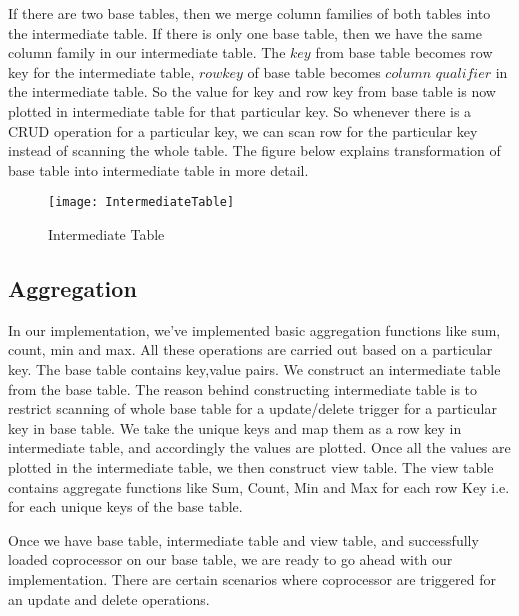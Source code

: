 \documentclass[11pt,a4paper,bibtotoc,idxtotoc,headsepline,footsepline,footexclude,BCOR12mm,DIV13]{scrbook}
\begin{document}
If there are two base tables, then we merge column families of both tables into the intermediate table. If there is only one base table, then we have the same column family in our intermediate table. The $key$ from base table becomes row key for the intermediate table, $row key$ of base table becomes $column$ $qualifier$ in the intermediate table. So the value for key and row key from base table is now plotted in intermediate table for that particular key. So whenever there is a CRUD operation for a particular key, we can scan row for the particular key instead of scanning the whole table. The figure below explains transformation of base table into intermediate table in more detail. 

\begin{figure}
	\centering
	\texttt{[image: IntermediateTable]}
	\caption{Intermediate Table}
	
\end{figure}

\newpage
\subsection{Aggregation}
\label{sec:aggregationImpl}

In our implementation, we've implemented basic aggregation functions like sum, count, min and max. All these operations are carried out based on a particular key. The base table contains key,value pairs. We construct an intermediate table from the base table. The reason behind constructing intermediate table is to restrict scanning of whole base table for a update/delete trigger for a particular key in base table. We take the unique keys and map them as a row key in intermediate table, and accordingly the values are plotted. Once all the values are plotted in the intermediate table, we then construct view table. The view table contains aggregate functions like Sum, Count, Min and Max for each row Key i.e. for each unique keys of the base table. 


	

Once we have base table, intermediate table and view table, and successfully loaded coprocessor on our base table, we are ready to go ahead with our implementation. There are certain scenarios where coprocessor are triggered for an update and delete operations.
\end{document}

